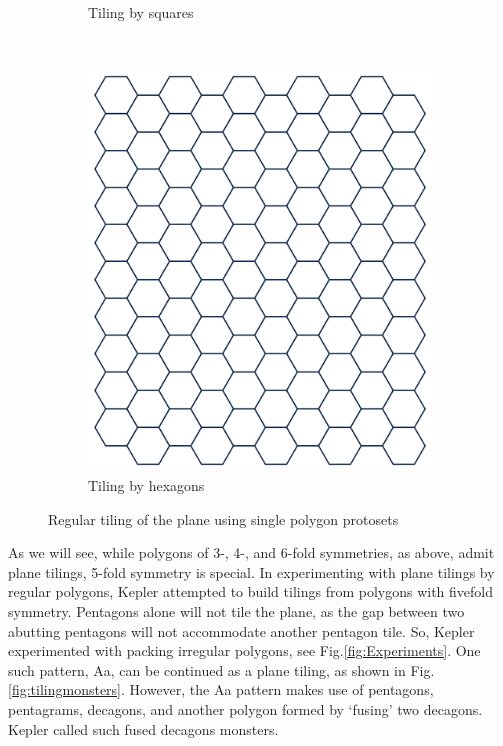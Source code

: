 \documentclass[
  oneside,
  11pt, a4paper,
  footinclude=true,
  headinclude=true,
  cleardoublepage=empty
]{scrbook}
\begin{document}
\begin{figure}[H]
\begin{subfigure}[b]{0.35\textwidth}
                \caption{Tiling by squares}
                \label{fig:square}
        \end{subfigure}\hfill
        ~ %
        \begin{subfigure}[b]{0.3\textwidth}
                \includegraphics[width=\textwidth]{hexagon}
                \caption{Tiling by hexagons}
                \label{fig:hexagon}
        \end{subfigure}
        \caption[Regular Polygon Tilings]{Regular tiling of the plane using single polygon protosets}\label{fig:regular}
\end{figure}

As we will see, while polygons of 3-, 4-, and 6-fold symmetries, as above, admit plane tilings, 5-fold symmetry is special. In experimenting with plane tilings by regular polygons, Kepler attempted to build tilings from polygons with fivefold symmetry. Pentagons alone will not tile the plane, as the gap between two abutting pentagons will not accommodate another pentagon tile. So, Kepler experimented with packing irregular polygons, see Fig.\ref{fig:Experiments}. One such pattern, Aa, can be continued as a plane tiling, as shown in Fig.\ref{fig:tilingmonsters}. However, the Aa pattern makes use of pentagons, pentagrams, decagons, and another polygon formed by `fusing' two decagons. Kepler called such fused decagons monsters. 
\end{document}
